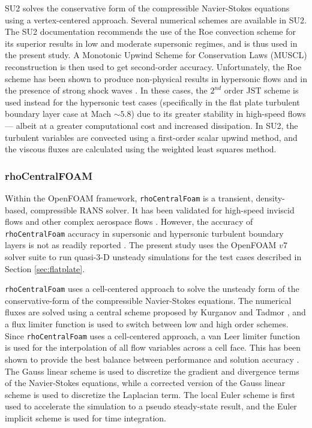 \documentclass[journal ]{new-aiaa}
\begin{document}
SU2 solves the conservative form of the compressible Navier-Stokes equations using a vertex-centered approach. Several numerical schemes are available in SU2. The SU2 documentation recommends the use of the Roe convection scheme for its superior results in low and moderate supersonic regimes, and is thus used in the present study. A Monotonic Upwind Scheme for Conservation Laws (MUSCL) reconstruction is then used to get second-order accuracy. Unfortunately, the Roe scheme has been shown to produce non-physical results in hypersonic flows and in the presence of strong shock waves \cite{Li2017}. In these cases, the $2^{nd}$ order JST scheme is used instead for the hypersonic test cases (specifically in the flat plate turbulent boundary layer case at Mach $\sim5.8$) due to its greater stability in high-speed flows --- albeit at a greater computational cost and increased dissipation. In SU2, the turbulent variables are convected using a first-order scalar upwind method, and the viscous fluxes are calculated using the weighted least squares method. 

\subsubsection{rhoCentralFOAM}
Within the OpenFOAM framework, \texttt{rhoCentralFoam} is a transient, density-based, compressible RANS solver. It has been validated for high-speed inviscid flows \cite{Luis2012} and other  complex aerospace flows \cite{Bukva2021}. However, the accuracy of \texttt{rhoCentralFoam} accuracy in supersonic and hypersonic turbulent boundary layers is not as readily reported \cite{Soni_2017}. The present study uses the OpenFOAM $v7$ solver suite to run quasi-3-D unsteady simulations for the test cases described in Section \ref{sec:flatplate}.

\texttt{rhoCentralFoam} uses a cell-centered approach to solve the unsteady form of the  conservative-form of the compressible Navier-Stokes equations. The numerical fluxes are solved using a central scheme proposed by Kurganov and Tadmor \cite{Kurganov2000-2, Kurganov2000, Greenshields2010}, and a flux limiter function is used to switch between low and high order schemes. Since \texttt{rhoCentralFoam} uses a cell-centered approach, a van Leer limiter function is used for the interpolation of all flow variables across a cell face. This has been shown to provide the best balance between performance and solution accuracy \cite{Luis2012}. The Gauss linear scheme is used to discretize the gradient and divergence terms of the Navier-Stokes equations, while a corrected version of the Gauss linear scheme is used to discretize the Laplacian term. The local Euler scheme is first used to accelerate the simulation to a pseudo steady-state result, and the Euler implicit scheme is used for time integration. 
\end{document}
